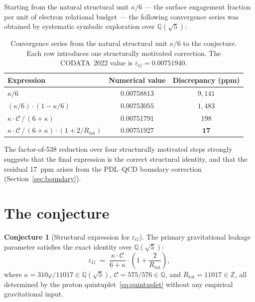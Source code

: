 \documentclass[11pt,a4paper]{article}
\theoremstyle{definition}
\newtheorem{conjecture}[theorem]{Conjecture}
\newcommand{\Rtot}{R_{\mathrm{tot}}}
\newcommand{\epsg}{\varepsilon_G}
\newcommand{\calC}{\mathcal{C}}
\newcommand{\vp}{\varphi}
\newcommand{\kap}{\kappa}
\begin{document}
Starting from the natural structural unit $\kap/6$ --- the surface engagement fraction per unit of electron relational budget --- the following convergence series was obtained by systematic symbolic exploration over $\mathbb{Q}(\sqrt{5})$:

\begin{table}[ht]
\centering
\caption{Convergence series from the natural structural unit $\kap/6$ to the conjecture. Each row introduces one structurally motivated correction. The CODATA~2022 value is $\epsg = 0.00751940$.}
\label{tab:convergence}
\bigskip
\begin{tabular}{p{7.5cm}cc}
\toprule
Expression & Numerical value & Discrepancy (ppm) \\
\midrule
$\kap/6$ & $0.00758813$ & $9{,}141$ \\
$(\kap/6)\cdot(1-\kap/6)$ & $0.00753055$ & $1{,}483$ \\
$\kap\cdot\calC\,/\,(6+\kap)$ & $0.00751791$ & $198$ \\
$\kap\cdot\calC\,/\,(6+\kap)\cdot(1+2/\Rtot)$ & $0.00751927$ & $\mathbf{17}$ \\
\bottomrule
\end{tabular}
\end{table}

The factor-of-538 reduction over four structurally motivated steps strongly suggests that the final expression is the correct structural identity, and that the residual 17~ppm arises from the PDL--QCD boundary correction (Section~\ref{sec:boundary}).

\section{The conjecture}
\label{sec:conjecture}

\begin{conjecture}[Structural expression for $\epsg$]
\label{conj:eps_G}
The primary gravitational leakage parameter satisfies the exact identity over $\mathbb{Q}(\sqrt{5})$:
\begin{equation}
\label{eq:conjecture}
\epsg \;=\; \frac{\kap\cdot\calC}{6+\kap}\cdot\left(1+\frac{2}{\Rtot}\right),
\end{equation}
where $\kap = 310\vp/11017 \in \mathbb{Q}(\sqrt{5})$, $\calC = 575/576 \in \mathbb{Q}$, and $\Rtot = 11017 \in \mathbb{Z}$, all determined by the proton quintuplet~\eqref{eq:quintuplet} without any empirical gravitational input.
\end{conjecture}
\end{document}
